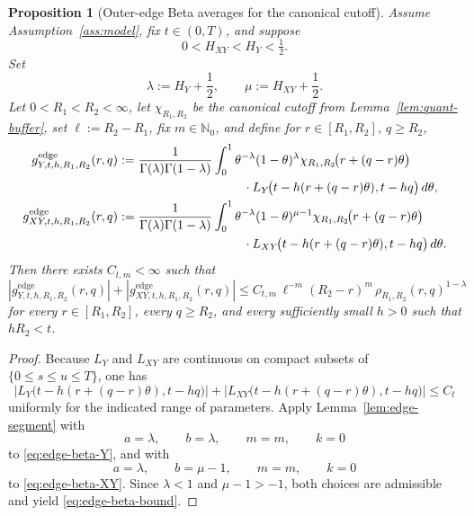 \documentclass[11pt,a4paper]{amsart}
\theoremstyle{plain}
\newtheorem{proposition}[theorem]{Proposition}
\theoremstyle{definition}
\theoremstyle{remark}
\begin{document}
\begin{proposition}[Outer-edge Beta averages for the canonical cutoff]
\label{prop:edge-beta}
Assume Assumption~\ref{ass:model}, fix \(t\in(0,T)\), and suppose
\[
0<H_{XY}<H_Y<\tfrac12.
\]
Set
\[
\lambda:=H_Y+\frac12,
\qquad
\mu:=H_{XY}+\frac12.
\]
Let \(0<R_1<R_2<\infty\), let \(\chi_{R_1,R_2}\) be the canonical cutoff from
Lemma~\ref{lem:quant-buffer}, set \(\ell:=R_2-R_1\), fix \(m\in\mathbb N_0\), and define for
\(r\in[R_1,R_2]\), \(q\ge R_2\),
\begin{align}
g_{Y,t,h,R_1,R_2}^{\mathrm{edge}}(r,q)
&:=
\frac{1}{\Gamma(\lambda)\Gamma(1-\lambda)}
\int_0^1
\theta^{-\lambda}(1-\theta)^\lambda
\chi_{R_1,R_2}\!\bigl(r+(q-r)\theta\bigr)
\notag\\
&\qquad\qquad\qquad\qquad\qquad\cdot
L_Y\!\bigl(t-h(r+(q-r)\theta),t-hq\bigr)\,d\theta,
\label{eq:edge-beta-Y}\\
g_{XY,t,h,R_1,R_2}^{\mathrm{edge}}(r,q)
&:=
\frac{1}{\Gamma(\lambda)\Gamma(1-\lambda)}
\int_0^1
\theta^{-\lambda}(1-\theta)^{\mu-1}
\chi_{R_1,R_2}\!\bigl(r+(q-r)\theta\bigr)
\notag\\
&\qquad\qquad\qquad\qquad\qquad\cdot
L_{XY}\!\bigl(t-h(r+(q-r)\theta),t-hq\bigr)\,d\theta.
\label{eq:edge-beta-XY}
\end{align}
Then there exists \(C_{t,m}<\infty\) such that
\begin{equation}\label{eq:edge-beta-bound}
\left|
g_{Y,t,h,R_1,R_2}^{\mathrm{edge}}(r,q)
\right|
+
\left|
g_{XY,t,h,R_1,R_2}^{\mathrm{edge}}(r,q)
\right|
\le
C_{t,m}\,\ell^{-m}(R_2-r)^m\,\rho_{R_1,R_2}(r,q)^{1-\lambda}
\end{equation}
for every \(r\in[R_1,R_2]\), every \(q\ge R_2\), and every sufficiently small \(h>0\) such that
\(hR_2<t\).
\end{proposition}

\begin{proof}
Because \(L_Y\) and \(L_{XY}\) are continuous on compact subsets of
\(\{0\le s\le u\le T\}\), one has
\[
\left|
L_Y\!\bigl(t-h(r+(q-r)\theta),t-hq\bigr)
\right|
+
\left|
L_{XY}\!\bigl(t-h(r+(q-r)\theta),t-hq\bigr)
\right|
\le
C_t
\]
uniformly for the indicated range of parameters. Apply Lemma~\ref{lem:edge-segment} with
\[
a=\lambda,
\qquad
b=\lambda,
\qquad
m=m,
\qquad
k=0
\]
to \eqref{eq:edge-beta-Y}, and with
\[
a=\lambda,
\qquad
b=\mu-1,
\qquad
m=m,
\qquad
k=0
\]
to \eqref{eq:edge-beta-XY}. Since \(\lambda<1\) and \(\mu-1>-1\), both choices are admissible and
yield \eqref{eq:edge-beta-bound}.
\end{proof}
\end{document}
